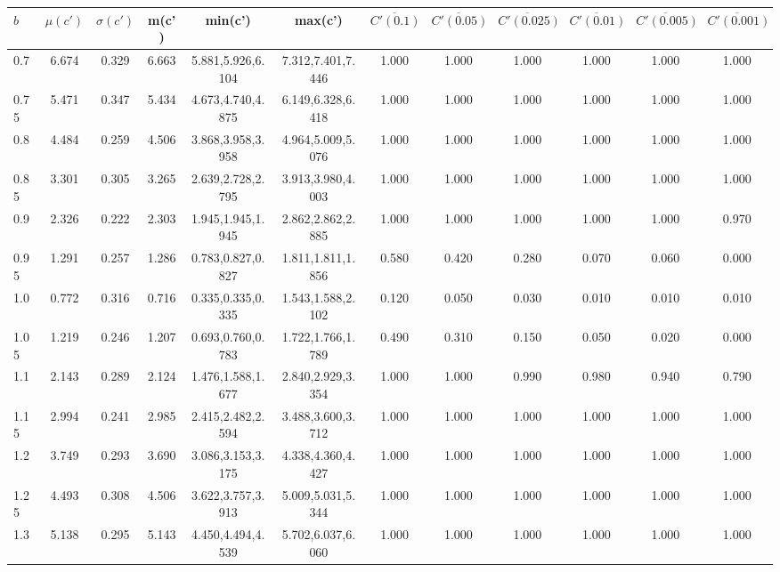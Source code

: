 \begin{table*}[h!]
\begin{center}
\begin{tabular}{| l | c | c | c | c | c | c | c | c | c | c | c |}\hline
$b$ & $\mu(c')$ & $\sigma(c')$ & m(c') & min(c') & max(c') & $\overline{C'(0.1)}$ & $\overline{C'(0.05)}$ & $\overline{C'(0.025)}$ & $\overline{C'(0.01)}$ & $\overline{C'(0.005)}$ & $\overline{C'(0.001)}$ \\\hline
0.7 & 6.674 & 0.329 & 6.663 & 5.881,5.926,6.104 & 7.312,7.401,7.446  & 1.000  & 1.000  & 1.000  & 1.000  & 1.000  & 1.000 \\\hline
0.75 & 5.471 & 0.347 & 5.434 & 4.673,4.740,4.875 & 6.149,6.328,6.418  & 1.000  & 1.000  & 1.000  & 1.000  & 1.000  & 1.000 \\\hline
0.8 & 4.484 & 0.259 & 4.506 & 3.868,3.958,3.958 & 4.964,5.009,5.076  & 1.000  & 1.000  & 1.000  & 1.000  & 1.000  & 1.000 \\\hline
0.85 & 3.301 & 0.305 & 3.265 & 2.639,2.728,2.795 & 3.913,3.980,4.003  & 1.000  & 1.000  & 1.000  & 1.000  & 1.000  & 1.000 \\\hline
0.9 & 2.326 & 0.222 & 2.303 & 1.945,1.945,1.945 & 2.862,2.862,2.885  & 1.000  & 1.000  & 1.000  & 1.000  & 1.000  & 0.970 \\\hline
0.95 & 1.291 & 0.257 & 1.286 & 0.783,0.827,0.827 & 1.811,1.811,1.856  & 0.580  & 0.420  & 0.280  & 0.070  & 0.060  & 0.000 \\\hline
1.0 & 0.772 & 0.316 & 0.716 & 0.335,0.335,0.335 & 1.543,1.588,2.102  & 0.120  & 0.050  & 0.030  & 0.010  & 0.010  & 0.010 \\\hline
1.05 & 1.219 & 0.246 & 1.207 & 0.693,0.760,0.783 & 1.722,1.766,1.789  & 0.490  & 0.310  & 0.150  & 0.050  & 0.020  & 0.000 \\\hline
1.1 & 2.143 & 0.289 & 2.124 & 1.476,1.588,1.677 & 2.840,2.929,3.354  & 1.000  & 1.000  & 0.990  & 0.980  & 0.940  & 0.790 \\\hline
1.15 & 2.994 & 0.241 & 2.985 & 2.415,2.482,2.594 & 3.488,3.600,3.712  & 1.000  & 1.000  & 1.000  & 1.000  & 1.000  & 1.000 \\\hline
1.2 & 3.749 & 0.293 & 3.690 & 3.086,3.153,3.175 & 4.338,4.360,4.427  & 1.000  & 1.000  & 1.000  & 1.000  & 1.000  & 1.000 \\\hline
1.25 & 4.493 & 0.308 & 4.506 & 3.622,3.757,3.913 & 5.009,5.031,5.344  & 1.000  & 1.000  & 1.000  & 1.000  & 1.000  & 1.000 \\\hline
1.3 & 5.138 & 0.295 & 5.143 & 4.450,4.494,4.539 & 5.702,6.037,6.060  & 1.000  & 1.000  & 1.000  & 1.000  & 1.000  & 1.000 \\\hline

\end{tabular}
\end{center}
\end{table*}
